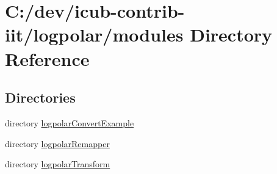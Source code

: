 \section{C\+:/dev/icub-\/contrib-\/iit/logpolar/modules Directory Reference}
\label{dir_e05d7e2b1ecd646af5bb94391405f3b5}
\subsection*{Directories}
\begin{DoxyCompactItemize}
\item 
directory \hyperlink{dir_2acae81d53fb0ec3db4f99aa97360f86}{logpolar\+Convert\+Example}
\item 
directory \hyperlink{dir_d034c5d20584dcbf7d9c8b029dc89c92}{logpolar\+Remapper}
\item 
directory \hyperlink{dir_570f4a234c06505f6ec71d919eb71faf}{logpolar\+Transform}
\end{DoxyCompactItemize}
